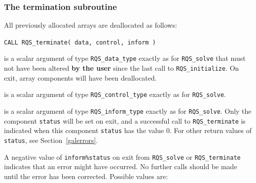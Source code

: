 \documentclass{galahad}
\newcommand{\packagename}{RQS}
\begin{document}

\subsubsection{The  termination subroutine}
All previously allocated arrays are deallocated as follows:

\hskip0.5in
{\tt CALL \packagename\_terminate( data, control, inform )}

\begin{description}

 is a scalar \intentinout argument of type
{\tt \packagename\_data\_type}
exactly as for
{\tt \packagename\_solve}
that must not have been altered {\bf by the user} since the last call to
{\tt \packagename\_initialize}.
On exit, array components will have been deallocated.

 is a scalar \intentin argument of type
{\tt \packagename\_control\_type}
exactly as for
{\tt \packagename\_solve}.

 is a scalar \intentout argument of type
{\tt \packagename\_inform\_type}
exactly as for
{\tt \packagename\_solve}.
Only the component {\tt status} will be set on exit, and a
successful call to
{\tt \packagename\_terminate}
is indicated when this  component {\tt status} has the value 0.
For other return values of {\tt status}, see Section~\ref{galerrors}.

\end{description}


\galerrors
A negative value of  {\tt inform\%status} on exit from
{\tt \packagename\_solve}
or
{\tt \packagename\_terminate}
indicates that an error might have occurred. No further calls should be made
until the error has been corrected. Possible values are:
\end{document}
